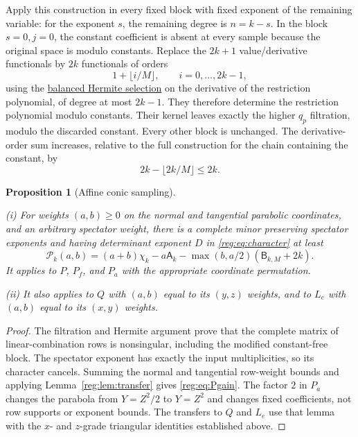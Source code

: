 \documentclass[11pt]{amsart}
\newtheorem{proposition}[theorem]{Proposition}
\theoremstyle{definition}
\theoremstyle{remark}
\numberwithin{equation}{section}
\begin{document}
Apply this construction in every fixed block with fixed exponent of the remaining variable: for the exponent $s$, the remaining degree is $n=k-s$. In the block $s=0,j=0$, the constant coefficient is absent at every sample because the original space is modulo constants. Replace the $2k+1$ value/derivative functionals by $2k$ functionals of orders
\begin{equation}\label{reg:eq:constant-correction}
 1+\lfloor i/M\rfloor,\qquad i=0,\ldots,2k-1,
\end{equation}
using the \hyperref[reg:balanced-hermite]{balanced Hermite selection} on the derivative of the restriction polynomial, of degree at most $2k-1$. They therefore determine the restriction polynomial modulo constants. Their kernel leaves exactly the higher $q_p$ filtration, modulo the discarded constant. Every other block is unchanged. The derivative-order sum increases, relative to the full construction for the chain containing the constant, by
\[
 2k-\lfloor 2k/M\rfloor\le2k.
\]

\begin{proposition}[Affine conic sampling]\label{reg:prop:P}

\leavevmode\noindent\textup{(i)} For weights $(a,b)\ge0$ on the normal and tangential parabolic coordinates, and an arbitrary spectator weight, there is a complete minor preserving spectator exponents and having determinant exponent $D$ in \eqref{reg:eq:character} at least
\begin{equation}\label{reg:eq:Pgain}
 \mathcal P_k(a,b)=(a+b)\chi_k-a\mathsf A_k-\max(b,a/2)(\mathsf B_{k,M}+2k).
\end{equation}
It applies to $P$, $P_f$, and $P_a$ with the appropriate coordinate permutation.

\noindent\textup{(ii)} It also applies to $Q$ with $(a,b)$ equal to its $(y,z)$ weights, and to $L_e$ with $(a,b)$ equal to its $(x,y)$ weights.
\end{proposition}
\begin{proof}
The filtration and Hermite argument prove that the complete matrix of linear-combination rows is nonsingular, including the modified constant-free block. The spectator exponent has exactly the input multiplicities, so its character cancels. Summing the normal and tangential row-weight bounds and applying Lemma~\ref{reg:lem:transfer} gives \eqref{reg:eq:Pgain}. The factor $2$ in $P_a$ changes the parabola from $Y=Z^2/2$ to $Y=Z^2$ and changes fixed coefficients, not row supports or exponent bounds. The transfers to $Q$ and $L_e$ use that lemma with the $x$- and $z$-grade triangular identities established above.
\end{proof}
\end{document}

